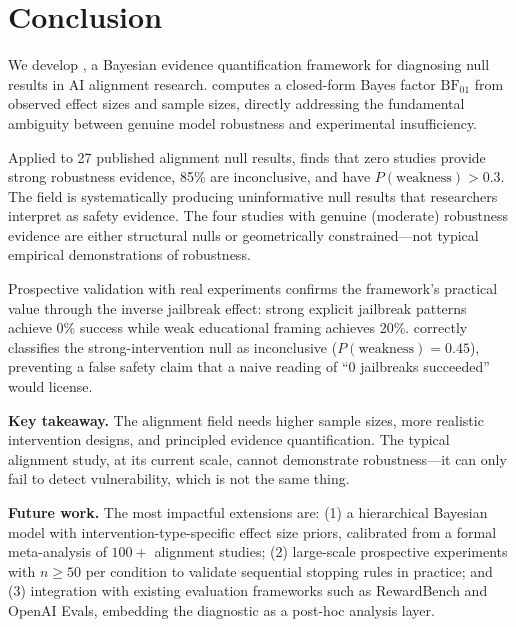 \section{Conclusion}
\label{sec:conclusion}

We develop \ours, a Bayesian evidence quantification framework for diagnosing null
results in AI alignment research. \ours computes a closed-form Bayes factor
$\mathrm{BF}_{01}$ from observed effect sizes and sample sizes, directly addressing
the fundamental ambiguity between genuine model robustness and experimental
insufficiency.

Applied to 27 published alignment null results, \ours finds that zero studies provide
strong robustness evidence, 85\% are inconclusive, and \mainresult have $P(\text{weakness}) > 0.3$.
The field is systematically producing uninformative null results that researchers
interpret as safety evidence. The four studies with genuine (moderate) robustness
evidence are either structural nulls or geometrically constrained---not typical
empirical demonstrations of robustness.

Prospective validation with real \llama experiments confirms the framework's practical
value through the inverse jailbreak effect: strong explicit jailbreak patterns achieve
0\% success while weak educational framing achieves 20\%. \ours correctly classifies
the strong-intervention null as inconclusive ($P(\text{weakness}) = 0.45$), preventing
a false safety claim that a naive reading of ``0 jailbreaks succeeded'' would license.

{\bf Key takeaway.} The alignment field needs higher sample sizes, more realistic
intervention designs, and principled evidence quantification. The typical alignment
study, at its current scale, cannot demonstrate robustness---it can only fail to
detect vulnerability, which is not the same thing.

{\bf Future work.} The most impactful extensions are: (1) a hierarchical Bayesian
model with intervention-type-specific effect size priors, calibrated from a formal
meta-analysis of $100+$ alignment studies; (2) large-scale prospective experiments
with $n \geq 50$ per condition to validate sequential stopping rules in practice;
and (3) integration with existing evaluation frameworks such as RewardBench
\citep{lambert2024rewardbench} and OpenAI Evals, embedding the \ours diagnostic
as a post-hoc analysis layer.
